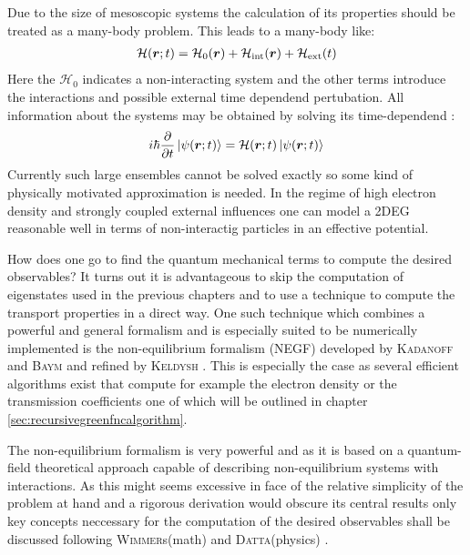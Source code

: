 Due to the size of mesoscopic systems the calculation of its properties should be treated as a many-body problem. This leads to a many-body \hamil{} like:
\begin{align}
\mathcal{H}(\boldsymbol{r};t) = \mathcal{H}_0(\boldsymbol{r}) + \mathcal{H}_{\text{int}}(\boldsymbol{r})+\mathcal{H}_{\text{ext}}(t)
\end{align}
Here the $\mathcal{H}_0$ indicates a non-interacting system and the other terms introduce the interactions and possible external time dependend pertubation. 
All information about the systems may be obtained by solving its time-dependend \sdg{}:
\begin{align}
i\hbar \frac{\partial }{\partial t} \left| \psi(\boldsymbol{r};t) \right> = \mathcal{H}(\boldsymbol{r};t) \left| \psi(\boldsymbol{r};t) \right>
\label{eqn:timedependendsdg}
\end{align}
Currently such large ensembles cannot be solved exactly so some kind of physically motivated approximation is needed. In the regime of high electron density and strongly coupled external influences one can model a 2DEG reasonable well in terms of non-interactig particles in an effective potential\cite{fetter2003quantum}. \par
How does one go to find the quantum mechanical terms to compute the desired observables? It turns out it is advantageous to skip the computation of eigenstates used in the previous chapters and to use a technique to compute the transport properties in a direct way. One such technique which combines a powerful and general formalism and is especially suited to be numerically implemented is the non-equilibrium \gfnc{} formalism (NEGF) developed by \textsc{Kadanoff} and \textsc{Baym} \cite{kadanoff1962quantum} and refined by \textsc{Keldysh} \cite{keldysh1965}. This is especially the case as several efficient algorithms exist that compute for example the electron density or the transmission coefficients one of which will be outlined in chapter \ref{sec:recursivegreenfncalgorithm}.\par
The non-equilibrium \gfnc{} formalism is very powerful and as it is based on a quantum-field theoretical approach capable of describing non-equilibrium systems with interactions. As this might seems excessive in face of the relative simplicity of the problem at hand and a rigorous derivation would obscure its central results only key concepts neccessary for the computation of the desired observables shall be discussed following \textsc{Wimmer}s(math) \cite{Wimmer2009Thesis} and \textsc{Datta}(physics) \cite{Datta1997}.\par

